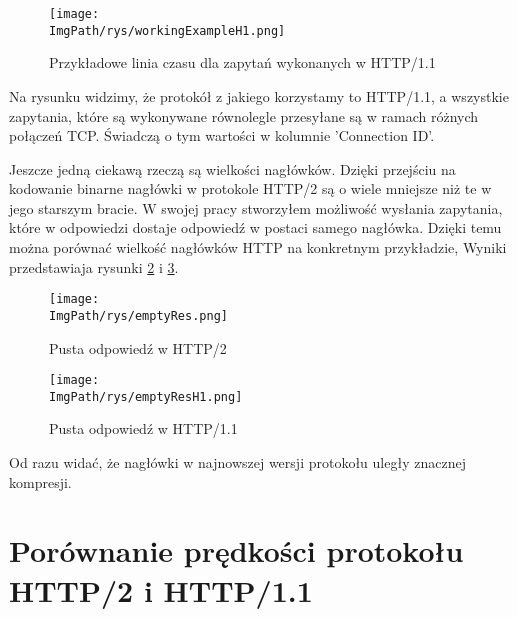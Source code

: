 \documentclass[a4paper,12pt,twoside,openany]{report}
\newcommand{\ImgPath}{.}
\begin{document}
\begin{figure}[!htbp]
	\begin{center}
\centering
\texttt{[image: \\ImgPath/rys/workingExampleH1.png]}
\end{center}
	\caption{Przykładowe linia czasu dla zapytań wykonanych w HTTP/1.1}
	\label{schematWorkingExampleH1}
\end{figure}

Na rysunku widzimy, że protokół z jakiego korzystamy to HTTP/1.1, a wszystkie zapytania, które są wykonywane równolegle przesyłane są w ramach różnych połączeń TCP.
Świadczą o tym wartości w kolumnie 'Connection ID'.

Jeszcze jedną ciekawą rzeczą są wielkości nagłówków.
Dzięki przejściu na kodowanie binarne nagłówki w protokole HTTP/2 są o wiele mniejsze niż te w jego starszym bracie.
W swojej pracy stworzyłem możliwość wysłania zapytania, które w odpowiedzi dostaje odpowiedź w postaci samego nagłówka.
Dzięki temu można porównać wielkość nagłówków HTTP na konkretnym przykładzie,
Wyniki przedstawiaja rysunki \ref{schematEmptyRes} i \ref{schematEmptyResH1}.

\begin{figure}[!htbp]
	\begin{center}
\centering
\texttt{[image: \\ImgPath/rys/emptyRes.png]}
\end{center}
	\caption{Pusta odpowiedź w HTTP/2}
	\label{schematEmptyRes}
\end{figure}

\begin{figure}[!htbp]
	\begin{center}
\centering
\texttt{[image: \\ImgPath/rys/emptyResH1.png]}
\end{center}
	\caption{Pusta odpowiedź w HTTP/1.1}
	\label{schematEmptyResH1}
\end{figure}

Od razu widać, że nagłówki w najnowszej wersji protokołu uległy znacznej kompresji. 


\section{Porównanie prędkości protokołu HTTP/2 i HTTP/1.1}
\end{document}
